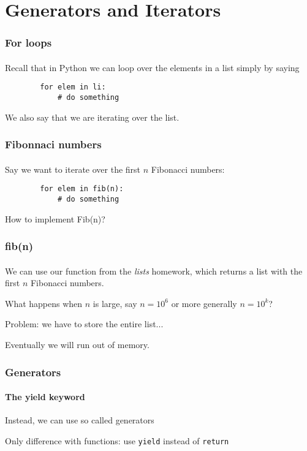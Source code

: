 \section{Generators and Iterators} %
\label{sec:iterators}

\begin{frame}[fragile]\frametitle{For loops}
    \framesubtitle{}

    Recall that in Python we can loop over the elements in a list simply
    by saying

    \begin{verbatim}
        for elem in li:
            # do something
    \end{verbatim}

    We also say that we are iterating over the list.

\end{frame}

\begin{frame}[fragile]\frametitle{Fibonnaci numbers}
    \framesubtitle{}

    Say we want to iterate over the first $n$ Fibonacci numbers:

    \begin{verbatim}
        for elem in fib(n):
            # do something
    \end{verbatim}

    \vfill

    How to implement Fib(n)?

\end{frame}

\begin{frame}[fragile]\frametitle{fib(n)}
    \framesubtitle{}

    We can use our function from the \emph{lists} homework, which returns a list
    with the first $n$ Fibonacci numbers.

    \vfill

    What happens when $n$ is large, say $n = 10^6$ or more generally $n = 10^k$?

    \pause\vfill

    Problem: we have to store the entire list...

    \pause Eventually we will run out of memory.

\end{frame}

\begin{frame}\frametitle{Generators}
    \framesubtitle{The yield keyword}

    Instead, we can use so called generators

    \vfill

    Only difference with functions: use \texttt{yield} instead of \texttt{return}

\end{frame}

